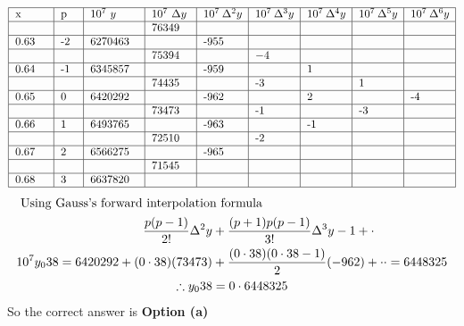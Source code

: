\begin{enumerate}
\begin{answer}
\begin{align*}
\begin{tabular}{|p{1cm}| p{.5cm}|p{1.5cm}|p{1.2cm} |p{1.2cm}|p{1.2cm}|p{1.2cm}|p{1.2cm}|p{1.2cm}|}
\hline
x&p&$10^7\ y$&$10^7\ \Delta y$&$10^7\ \Delta^2 y$&$10^7\ \Delta^3 y$&$10^7\ \Delta^4 y$&$10^7\ \Delta^5 y$&$10^7\ \Delta^6 y$\\
\hline
& & &76349& & & & &\\
\hline 
0.63&-2&6270463& &-955& & & &\\
\hline
& & &75394& &$-4$& & &  \\
\hline
0.64&-1&6345857& &-959& &1& & \\
\hline
& & &74435& &-3& &1& \\
\hline
0.65&0&6420292& &-962& &2& &-4 \\
\hline
 & & &73473& &-1& &-3&  \\
 \hline
 0.66&1&6493765& &-963& &-1& &  \\
 \hline
  & & &72510& &-2& & & \\
  \hline
  0.67&2&6566275& &-965& & & &  \\
  \hline
   & & &71545& & & & & \\
   \hline
    0.68&3&6637820& & & & & &  \\
    \hline
\end{tabular}
\end{align*}	
		\begin{align*}
	\intertext{	Using Gauss's forward interpolation formula}
		\frac{p(p-1)}{2 !} \Delta^{2} y&+\frac{(p+1) p(p-1)}{3 !} \Delta^{3} y-1+\cdot \\
		10^{7} y_{0} 38=6420292+(0 \cdot 38)(73473)&+\frac{(0 \cdot 38)(0 \cdot 38-1)}{2}(-962)+\cdot \cdot=6448325 \\
		\therefore y_{0} 38&=0 \cdot 6448325
		\end{align*}
			So the correct answer is \textbf{Option (a)}
	\end{answer}





	
	
	
	
	
	
	
	
	
	
	
	
	
	
	
	
	
	
	
	
	
	
	
\end{enumerate}